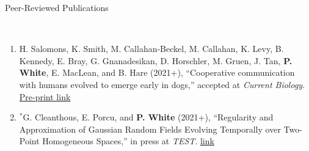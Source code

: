 \documentclass[11pt]{article}
\newcommand{\head}[1]{ %
    \bigskip %
    \begin{large}\begin{bf}{#1}\end{bf}\end{large} %

    \ \\ [-1.3cm] %

    \hrulefill}
\begin{document}
\vspace{2mm}
\head{Peer-Reviewed Publications}

\begin{enumerate}[label=$\bullet$]

%


\item H. Salomons, K. Smith, M. Callahan-Beckel, M. Callahan, K. Levy, B. Kennedy, E. Bray, G. Gnanadesikan, D. Horschler, M. Gruen, J. Tan, \textbf{P. White}, E. MacLean, and B. Hare (2021+), ``Cooperative communication with humans evolved to emerge early in dogs,'' accepted at \textit{Current Biology}. \href{https://www.biorxiv.org/content/10.1101/2021.01.12.425620v1}{Pre-print link} 

\item $^*$G. Cleanthous, E. Porcu, and \textbf{P. White} (2021+), ``Regularity and Approximation of Gaussian Random Fields Evolving Temporally over Two-Point Homogeneous Spaces,'' in press at \textit{TEST}.  \href{https://link.springer.com/article/10.1007/s11749-021-00755-1}{link}






\end{enumerate}
\end{document}
